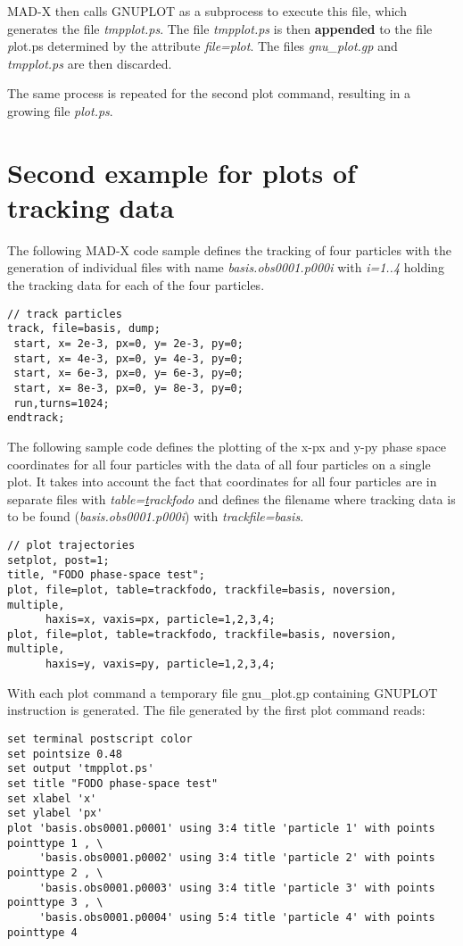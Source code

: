 MAD-X then calls GNUPLOT as a subprocess to execute this file, which
generates the file \textit{tmpplot.ps}.  
The file \textit{tmpplot.ps} is then {\bf appended} to the file 
{\textit plot.ps} determined by the attribute \textit{file=plot}.  
The files \textit{gnu\_plot.gp} and \textit{tmpplot.ps} are then
discarded. 

The same process is repeated for the second plot command, resulting in a
growing file \textit{plot.ps}.


\section{Second example for plots of tracking data}

The following MAD-X code sample defines the tracking of four particles 
with the generation of individual files with name
\textit{basis.obs0001.p000i} with \textit{i=1..4}  
holding the tracking data for each of the four particles.  

\begin{verbatim}
// track particles
track, file=basis, dump;
 start, x= 2e-3, px=0, y= 2e-3, py=0;
 start, x= 4e-3, px=0, y= 4e-3, py=0;
 start, x= 6e-3, px=0, y= 6e-3, py=0;
 start, x= 8e-3, px=0, y= 8e-3, py=0;
 run,turns=1024;
endtrack;
\end{verbatim}

The following sample code defines the plotting of the x-px and y-py
phase space coordinates for all four particles with the data of all four
particles on a single plot.  
It takes into account the fact that coordinates for all four particles
are in separate files with 
\textit{table={\underline track}fodo} and defines the filename where tracking
data is to be found (\textit{basis.obs0001.p000i}) with
\textit{trackfile=basis}.  

\begin{verbatim}
// plot trajectories
setplot, post=1; 
title, "FODO phase-space test";
plot, file=plot, table=trackfodo, trackfile=basis, noversion, multiple, 
      haxis=x, vaxis=px, particle=1,2,3,4; 
plot, file=plot, table=trackfodo, trackfile=basis, noversion, multiple, 
      haxis=y, vaxis=py, particle=1,2,3,4;  
\end{verbatim}

With each plot command a temporary file gnu\_plot.gp containing GNUPLOT instruction is generated. 
The file generated by the first plot command reads: 

\begin{verbatim}
set terminal postscript color
set pointsize 0.48
set output 'tmpplot.ps'
set title "FODO phase-space test"
set xlabel 'x'
set ylabel 'px'
plot 'basis.obs0001.p0001' using 3:4 title 'particle 1' with points pointtype 1 , \
     'basis.obs0001.p0002' using 3:4 title 'particle 2' with points pointtype 2 , \
     'basis.obs0001.p0003' using 3:4 title 'particle 3' with points pointtype 3 , \
     'basis.obs0001.p0004' using 5:4 title 'particle 4' with points pointtype 4 
\end{verbatim}

